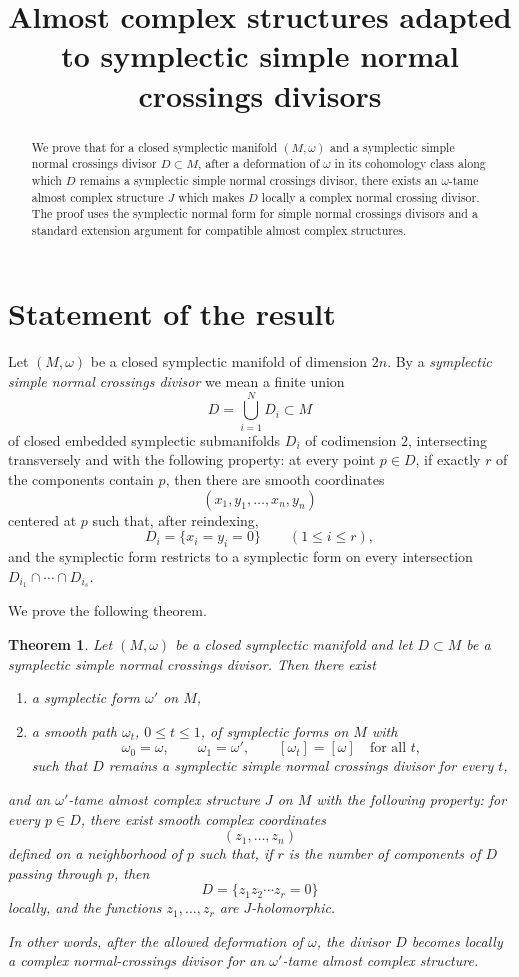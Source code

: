 \documentclass[11pt]{article}
\title{Almost complex structures adapted to symplectic simple normal crossings divisors}
\author{}
\date{}
\newtheorem{theorem}{Theorem}[section]
\theoremstyle{definition}
\theoremstyle{remark}
\begin{document}
\maketitle

\begin{abstract}
We prove that for a closed symplectic manifold \((M,\omega)\) and a symplectic simple normal crossings divisor \(D\subset M\), after a deformation of \(\omega\) in its cohomology class along which \(D\) remains a symplectic simple normal crossings divisor, there exists an \(\omega\)-tame almost complex structure \(J\) which makes \(D\) locally a complex normal crossing divisor. The proof uses the symplectic normal form for simple normal crossings divisors and a standard extension argument for compatible almost complex structures.
\end{abstract}

\section{Statement of the result}

Let \((M,\omega)\) be a closed symplectic manifold of dimension \(2n\). By a \emph{symplectic simple normal crossings divisor} we mean a finite union
\[
D=\bigcup_{i=1}^N D_i\subset M
\]
of closed embedded symplectic submanifolds \(D_i\) of codimension \(2\), intersecting transversely and with the following property: at every point \(p\in D\), if exactly \(r\) of the components contain \(p\), then there are smooth coordinates
\[
(x_1,y_1,\dots,x_n,y_n)
\]
centered at \(p\) such that, after reindexing,
\[
D_i=\{x_i=y_i=0\}\qquad (1\le i\le r),
\]
and the symplectic form restricts to a symplectic form on every intersection \(D_{i_1}\cap\cdots\cap D_{i_s}\).

We prove the following theorem.

\begin{theorem}\label{thm:main}
Let \((M,\omega)\) be a closed symplectic manifold and let \(D\subset M\) be a symplectic simple normal crossings divisor. Then there exist
\begin{enumerate}
\item a symplectic form \(\omega'\) on \(M\),
\item a smooth path \(\omega_t\), \(0\le t\le 1\), of symplectic forms on \(M\) with
\[
\omega_0=\omega,\qquad \omega_1=\omega',\qquad [\omega_t]=[\omega]\quad\text{for all }t,
\]
such that \(D\) remains a symplectic simple normal crossings divisor for every \(t\),
\end{enumerate}
and an \(\omega'\)-tame almost complex structure \(J\) on \(M\) with the following property: for every \(p\in D\), there exist smooth complex coordinates
\[
(z_1,\dots,z_n)
\]
defined on a neighborhood of \(p\) such that, if \(r\) is the number of components of \(D\) passing through \(p\), then
\[
D=\{z_1z_2\cdots z_r=0\}
\]
locally, and the functions \(z_1,\dots,z_r\) are \(J\)-holomorphic.

In other words, after the allowed deformation of \(\omega\), the divisor \(D\) becomes locally a complex normal-crossings divisor for an \(\omega'\)-tame almost complex structure.
\end{theorem}
\end{document}
